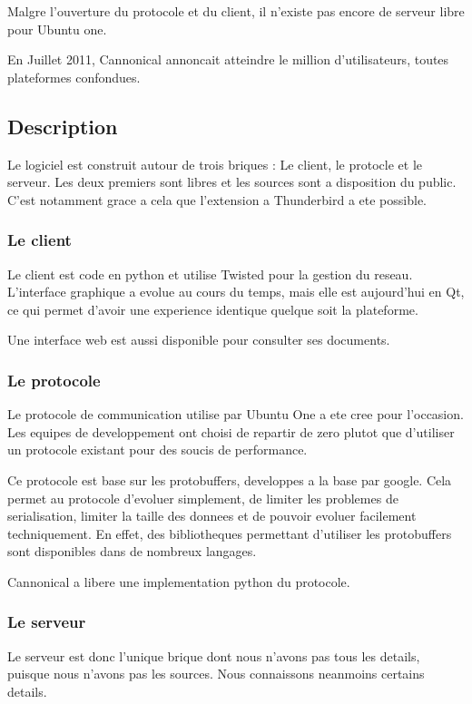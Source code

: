Malgre l'ouverture du protocole et du client, il n'existe pas encore de serveur libre pour Ubuntu one.

En Juillet 2011, Cannonical annoncait atteindre le million d'utilisateurs, toutes plateformes confondues.

\subsection{Description}
Le logiciel est construit autour de trois briques : Le client, le protocle et le serveur. Les deux premiers sont libres et les sources sont a disposition du public. C'est notamment grace a cela que l'extension a Thunderbird a ete possible.

\subsubsection{Le client}
Le client est code en python et utilise Twisted pour la gestion du reseau. L'interface graphique a evolue au cours du temps, mais elle est aujourd'hui en Qt, ce qui permet d'avoir une experience identique quelque soit la plateforme.

Une interface web est aussi disponible pour consulter ses documents.

\subsubsection{Le protocole}

Le protocole de communication utilise par Ubuntu One a ete cree pour l'occasion. Les equipes de developpement ont choisi de repartir de zero plutot que d'utiliser un protocole existant pour des soucis de performance.

Ce protocole est base sur les protobuffers, developpes a la base par google. Cela permet au protocole d'evoluer simplement, de limiter les problemes de serialisation, limiter la taille des donnees et de pouvoir evoluer facilement techniquement. En effet, des bibliotheques permettant d'utiliser les protobuffers sont disponibles dans de nombreux langages.

Cannonical a libere une implementation python du protocole.

\subsubsection{Le serveur}

Le serveur est donc l'unique brique dont nous n'avons pas tous les details, puisque nous n'avons pas les sources. Nous connaissons neanmoins certains details.

